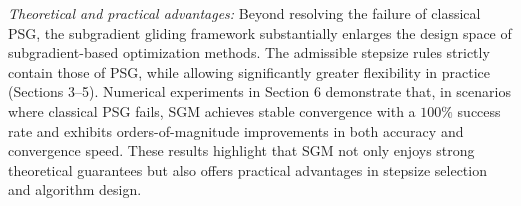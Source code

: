 \documentclass[sn-mathphys]{JORSC-jnl}%
\theoremstyle{thmstyleone}%
\theoremstyle{thmstylethree}%
\begin{document}
\textit{Theoretical and practical advantages:} Beyond resolving the failure of classical PSG, the subgradient gliding framework substantially enlarges the design space of subgradient-based optimization methods. The admissible stepsize rules strictly contain those of PSG, while allowing significantly greater flexibility in practice (Sections 3–5). Numerical experiments in Section 6 demonstrate that, in scenarios where classical PSG fails, SGM achieves stable convergence with a $100\%$ success rate and exhibits orders-of-magnitude improvements in both accuracy and convergence speed. These results highlight that SGM not only enjoys strong theoretical guarantees but also offers practical advantages in stepsize selection and algorithm design.

%
\end{document}
